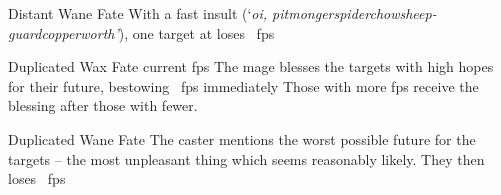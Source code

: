 \ifodd\value{diceNo}

  {Distant}%
  {Wane}%
  {Fate}%
  {}%
  {With a fast insult (`\textit{oi, \ifcase\value{r4}pitmonger\or spiderchow\or sheep-guard\else copperworth\fi'}), one target at \spellRange{} loses \showDam~\glspl{fp}}%
  {}

  {Duplicated}%
  {Wax}%
  {Fate}%
  {current \glspl{fp}}%
  {The mage blesses the targets with high hopes for their future, bestowing \showDam~\glspl{fp} immediately}%
  {Those with more \glspl{fp} receive the blessing after those with fewer.}

\else

  {Duplicated}%
  {Wane}%
  {Fate}%
  {}%
  {The caster mentions the worst possible future for the targets -- the most unpleasant thing which seems reasonably likely.
    They then loses \showDam~\glspl{fp}}%
  {}

\fi
{}
